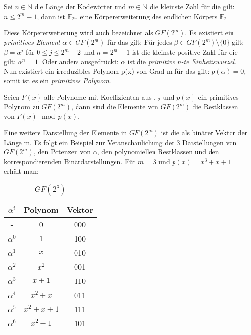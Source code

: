 \begin{t_def}
Sei $n \in \mathbb{N}$ die Länge der Kodewörter und $m \in \mathbb{N}$ die kleinste Zahl für die gilt: $n \leq 2^m -1$, dann ist $\mathbb{F}_{2^m}$ eine Körpererweiterung des endlichen Körpers $\mathbb{F}_{2}$
\end{t_def}

Diese Körpererweiterung wird auch bezeichnet als $GF(2^m)$. 
Es existiert ein \textit{primitives Element} $\alpha \in GF(2^m)$ für das gilt: Für jedes $\beta \in GF(2^m)\setminus\{0\}$ gilt: $\beta = \alpha^j$ für $0 \leq j \leq 2^m -2$ und $n = 2^m-1$ ist die kleinste positive Zahl für die gilt: $\alpha^n = 1$. Oder anders ausgedrückt: $\alpha$ ist die {\em primitive n-te Einheitswurzel}.\cite[S. 48ff]{morelos2006art}
Nun existiert ein irreduzibles Polynom p(x) von Grad m für das gilt: $p(\alpha) = 0$, somit ist es ein {\em primitives Polynom}.

\begin{t_def}
Seien $F(x)$ alle Polynome mit Koeffizienten aus $\mathbb{F}_2$ und $p(x)$ ein primitives Polynom zu $GF(2^m)$, dann sind die Elemente von $GF(2^m)$ die Restklassen von $F(x) \mod p(x)$.  \cite[S. 161]{bose2008infotheory}
\end{t_def}

Eine weitere Darstellung der Elemente in $GF(2^m)$ ist die als binärer Vektor der Länge m. Es folgt ein Beispiel zur Veranschaulichung der 3 Darstellungen von $GF(2^m)$, den Potenzen von $\alpha$, den polynomiellen Restklassen und den korrespondierenden Binärdarstellungen. Für $m=3$ und $p(x) = x^3 + x + 1$ erhält man:


\begin{table}[!h]
\begin{center}
\begin{tabular}{c|c|c}
$\alpha^i$ & Polynom & Vektor \\
\hline
- & 0 & 000 \\
$\alpha^0$ & $1$ & 100 \\
$\alpha^1$ & $x$ & 010 \\
$\alpha^2$ & $x^2$ & 001 \\
$\alpha^3$ & $x+1$ & 110 \\
$\alpha^4$ & $x^2+x$ & 011 \\
$\alpha^5$ & $x^2+x+1$ & 111 \\
$\alpha^6$ & $x^2+1$ & 101 \\
\end{tabular}
\caption{$GF(2^3)$}
\label{table:gf}
\end{center}
\end{table}





